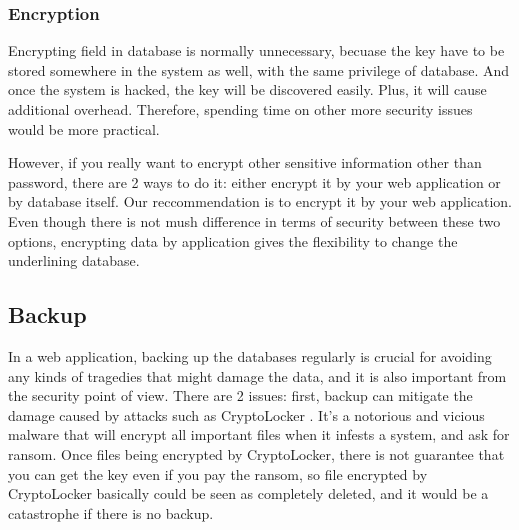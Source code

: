 \documentclass[conference]{IEEEtran}
\begin{document}
%
%





\subsubsection{Encryption}
Encrypting field in database is normally unnecessary,
becuase the key have to be stored somewhere in the system as well,
with the same privilege of database. And once the system is hacked,
the key will be discovered easily. Plus, it will cause additional
overhead. Therefore, spending time on other more security issues
would be more practical.

However, if you really want to encrypt other sensitive information other than password,
there are 2
ways to do it: either encrypt it by your web application or by database itself.
Our reccommendation is to encrypt it by your web application.
Even though there is not mush difference in terms of security between
these two options, encrypting data by application gives the flexibility
to change the underlining database.

\subsection{Backup}
In a web application, backing up the databases regularly
is crucial for avoiding any kinds of tragedies that might damage
the data, and
it is also important
from the security point of view. There are 2 issues: first,
backup can mitigate the damage caused by attacks such as CryptoLocker \cite{cryptolocker}.
It's a notorious and vicious malware that will encrypt all important files
when it infests a system, and ask for ransom.
Once files being encrypted by CryptoLocker,
there is not guarantee that you can get the key even if you pay the ransom,
so file encrypted by CryptoLocker basically could be seen as completely deleted,
and it would be a catastrophe if there is no backup.
\end{document}
